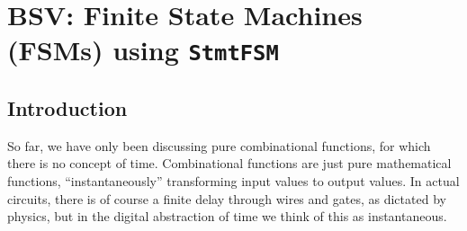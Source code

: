 

\chapter{BSV: Finite State Machines (FSMs) using {\tt StmtFSM}}


\setcounter{page}{1}
\renewcommand{\thepage}{\arabic{chapter}-\arabic{page}}

\label{ch_FSMs}


\section{Introduction}


So far, we have only been discussing pure combinational functions, for
which there is no concept of time.  Combinational functions are just
pure mathematical functions, ``instantaneously'' transforming input
values to output values.  In actual circuits, there is of course a
finite delay through wires and gates, as dictated by physics, but in
the digital abstraction of time we think of this as instantaneous.

